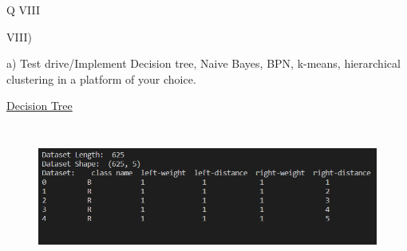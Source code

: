\documentclass[12pt]{article}
\renewcommand{\_}{\kern-1.5pt\textunderscore\kern-1.5pt}
\begin{document}
\vspace{\baselineskip}

\vspace{\baselineskip}

\vspace{\baselineskip}
\begin{Center}
{\fontsize{28pt}{33.6pt}\selectfont Q VIII\par}
\end{Center}\par

{\fontsize{14pt}{16.8pt}\selectfont VIII) \par}\par

{\fontsize{14pt}{16.8pt}\selectfont a) Test drive/Implement Decision tree, Naive Bayes, BPN, k-means, hierarchical clustering in a platform of your choice.\par}\par

{\fontsize{14pt}{16.8pt}\selectfont \uline{Decision Tree}\par}\par




\begin{figure}[H]
	\begin{Center}
		\includegraphics[width=6.5in,height=1.86in]{./media/image13.png}
	\end{Center}
\end{figure}



\par



\end{document}

